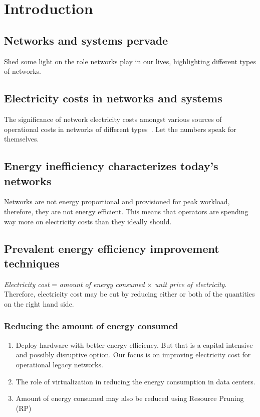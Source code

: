 \chapter{Introduction}
\label{chap:intro}

\section{Networks and systems pervade}
Shed some light on the role networks play in our lives, highlighting different types of networks.

\section{Electricity costs in networks and systems} 
The significance of network electricity costs amongst various sources of operational costs in networks of different types~\cite{brill:DataCenterCrisis:UI:2007}. Let the numbers speak for themselves.

\section{Energy inefficiency characterizes today's networks} Networks are not energy proportional and provisioned for peak workload, therefore, they are not energy efficient. This means that operators are spending way more on electricity costs than they ideally should. 

\section{Prevalent energy efficiency improvement techniques} \textit{Electricity cost} = \textit{amount of energy consumed} $\times$ \textit{unit price of electricity}. Therefore, electricity cost may be cut by reducing either or both of the quantities on the right hand side. 

\subsection{Reducing the amount of energy consumed}
\begin{enumerate}
\item Deploy hardware with better energy efficiency. But that is a capital-intensive and possibly disruptive option. Our focus is on improving electricity cost for operational legacy networks.
\item The role of virtualization in reducing the energy consumption in data centers.
\item Amount of energy consumed may also be reduced using Resource Pruning (RP)
\end{enumerate}

